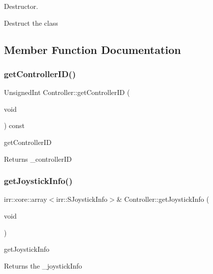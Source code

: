 Destructor. 

Destruct the class 

\subsection{Member Function Documentation}
\mbox{\label{classController_ab2294a9b730b80216705b7e9ae36a5bd}} 
\subsubsection{\texorpdfstring{get\+Controller\+I\+D()}{getControllerID()}}
{\footnotesize\ttfamily Unsigned\+Int Controller\+::get\+Controller\+ID (\begin{DoxyParamCaption}\item[{void}]{ }\end{DoxyParamCaption}) const}



get\+Controller\+ID 

\begin{DoxyReturn}{Returns}
\+\_\+controller\+ID 
\end{DoxyReturn}
\mbox{\label{classController_a1d628add26120f35d2dc53eabaa34d4b}} 
\subsubsection{\texorpdfstring{get\+Joystick\+Info()}{getJoystickInfo()}}
{\footnotesize\ttfamily irr\+::core\+::array$<$irr\+::\+S\+Joystick\+Info$>$\& Controller\+::get\+Joystick\+Info (\begin{DoxyParamCaption}\item[{void}]{ }\end{DoxyParamCaption})}



get\+Joystick\+Info 

\begin{DoxyReturn}{Returns}
the \+\_\+joystick\+Info 
\end{DoxyReturn}
\mbox{\label{classController_a43d5202e40ae827029fdca587d0bfeab}} 
